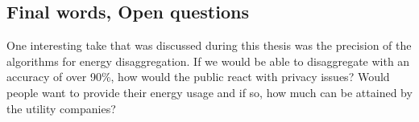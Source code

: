 \subsection{Final words, Open questions}
One interesting take that was discussed during this thesis was the precision of the algorithms for energy disaggregation. If we would be able to disaggregate with an accuracy of over 90\%, how would the public react with privacy issues? Would people want to provide their energy usage and if so, how much can be attained by the utility companies?